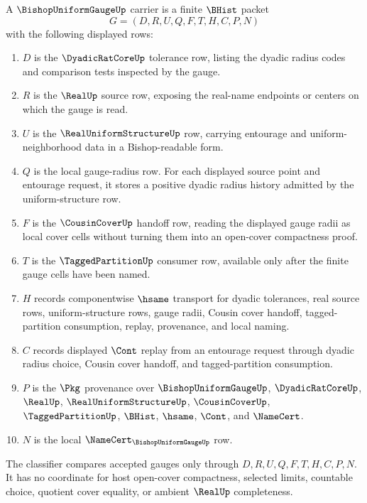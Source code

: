 \begin{definition}
\label{def:bishop-uniform-gauge-carrier}
A $\BishopUniformGaugeUp$ carrier is a finite $\BHist$ packet
$$
G=(D,R,U,Q,F,T,H,C,P,N)
$$
with the following displayed rows:
\begin{enumerate}
\item $D$ is the $\DyadicRatCoreUp$ tolerance row, listing the dyadic radius codes and comparison tests inspected by the gauge.
\item $R$ is the $\RealUp$ source row, exposing the real-name endpoints or centers on which the gauge is read.
\item $U$ is the $\RealUniformStructureUp$ row, carrying entourage and uniform-neighborhood data in a Bishop-readable form.
\item $Q$ is the local gauge-radius row. For each displayed source point and entourage request, it stores a positive dyadic radius history admitted by the uniform-structure row.
\item $F$ is the $\CousinCoverUp$ handoff row, reading the displayed gauge radii as local cover cells without turning them into an open-cover compactness proof.
\item $T$ is the $\TaggedPartitionUp$ consumer row, available only after the finite gauge cells have been named.
\item $H$ records componentwise $\hsame$ transport for dyadic tolerances, real source rows, uniform-structure rows, gauge radii, Cousin cover handoff, tagged-partition consumption, replay, provenance, and local naming.
\item $C$ records displayed $\Cont$ replay from an entourage request through dyadic radius choice, Cousin cover handoff, and tagged-partition consumption.
\item $P$ is the $\Pkg$ provenance over $\BishopUniformGaugeUp$, $\DyadicRatCoreUp$, $\RealUp$, $\RealUniformStructureUp$, $\CousinCoverUp$, $\TaggedPartitionUp$, $\BHist$, $\hsame$, $\Cont$, and $\NameCert$.
\item $N$ is the local $\NameCert_{\BishopUniformGaugeUp}$ row.
\end{enumerate}
The classifier compares accepted gauges only through $D,R,U,Q,F,T,H,C,P,N$. It has no coordinate for host open-cover compactness, selected limits, countable choice, quotient cover equality, or ambient $\RealUp$ completeness.
\end{definition}

